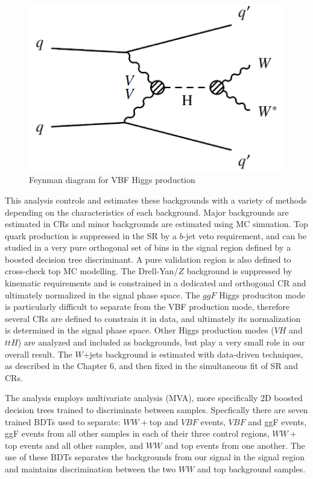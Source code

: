 \begin{figure}[!htbp]
    \centering
    \includegraphics[width=0.4\linewidth]{Pictures/fig_01b_2.pdf}
    \caption{Feynman diagram for VBF Higgs production \cite{Djouadi}}
    \label{fig:FeynmanDiagramVBF}
\end{figure}

This analysis controls and estimates these backgrounds with a variety of methods depending on the characteristics of each background. Major backgrounds are estimated in CRs and minor backgrounds are estimated using MC simuation. Top quark production is suppressed in the SR by a $b$-jet veto requirement, and can be studied in a very pure orthogonal set of bins in the signal region defined by a boosted decision tree discriminant. A pure validation region is also defined to cross-check top MC modelling. The Drell-Yan/$Z$ background is suppressed by kinematic requirements and is constrained in a dedicated and orthogonal CR and ultimately normalized in the signal phase space. The $ggF$ Higgs produciton mode is particularly difficult to separate from the VBF production mode, therefore several CRs are defined to constrain it in data, and ultimately its normalization is determined in the signal phase space. Other Higgs production modes ($VH$ and $ttH$) are analyzed and included as backgrounds, but play a very small role in our overall result. The $W$+jets background is estimated with data-driven techniques, as described in the Chapter 6, and then fixed in the simultaneous fit of SR and CRs.

The analysis employs multivariate analysis (MVA), more specifically 2D boosted decision trees trained to discriminate between samples. Specfically there are seven trained BDTs used to separate: $WW+$top and $VBF$ events, $VBF$ and ggF events, ggF events from all other samples in each of their three control regions, $WW+$top events and all other samples, and $WW$ and top events from one another. The use of these BDTs separates the backgrounds from our signal in the signal region and maintains discrimination between the two $WW$ and top background samples. 

